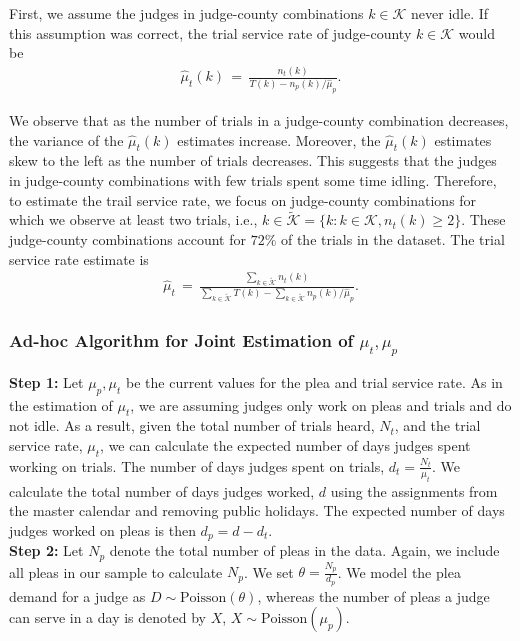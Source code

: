 \documentclass[11pt]{article}
\theoremstyle{ModifiedStyle}
\theoremstyle{ModifiedStyle}
\begin{document}
			First, we assume the judges in judge-county combinations $k\in\mathcal{K}$ never idle. If this assumption was correct, the trial service rate of judge-county $k\in\mathcal{K}$ would be
			\begin{align*}
				\hat{\mu}_t(k) \,=\, \frac{n_t(k)}{T(k) - n_p(k) / \hat{\mu}_p}.
			\end{align*}

      We observe that as the number of trials in a judge-county combination decreases, the variance of the $\hat{\mu}_t(k)$ estimates increase. Moreover, the $\hat{\mu}_t(k)$ estimates skew to the left as the number of trials decreases. This suggests that the judges in judge-county combinations with few trials spent some time idling. Therefore, to estimate the trail service rate, we focus on judge-county combinations for which we observe at least two trials, i.e., $k \in \tilde{\mathcal{K}} = \{k:k\in\mathcal{K},n_t(k)\geq 2\}$. These judge-county combinations account for $72\%$ of the trials in the dataset. The trial service rate estimate is
			\begin{align*}
				\hat{\mu}_t \,=\, \frac{ \sum\limits_{k\in\tilde{\mathcal{K}}} n_t(k) }{\sum\limits_{k\in\tilde{\mathcal{K}}} T(k) - \sum\limits_{k\in\tilde{\mathcal{K}}} n_p(k) / \hat{\mu}_p }.
			\end{align*}

    \subsubsection{Ad-hoc Algorithm for Joint Estimation of $\mu_t,\mu_p$}
      \textbf{Step 1:} Let $\mu_p,\mu_t$ be the current values for the plea and trial service rate. As in the estimation of $\mu_t$, we are assuming judges only work on pleas and trials and do not idle. As a result, given the total number of trials heard, $N_{t}$, and the trial service rate, $\mu_t$, we can calculate the expected number of days judges spent working on trials. The number of days judges spent on trials, $d_{t} = \frac{N_{t}}{\mu_t}$. We calculate the total number of days judges worked, $d$ using the assignments from the master calendar and removing public holidays. The expected number of days judges worked on pleas is then $d_{p} = d - d_{t}$. \\

      \noindent \textbf{Step 2:} Let $N_p$ denote the total number of pleas in the data. Again, we include all pleas in our sample to calculate $N_p$. We set $\theta = \frac{N_p}{d_p}$. We model the plea demand for a judge as $D \sim \text{Poisson}(\theta)$, whereas the number of pleas a judge can serve in a day is denoted by $X$, $X \sim \text{Poisson}(\mu_p)$. \\
\end{document}
